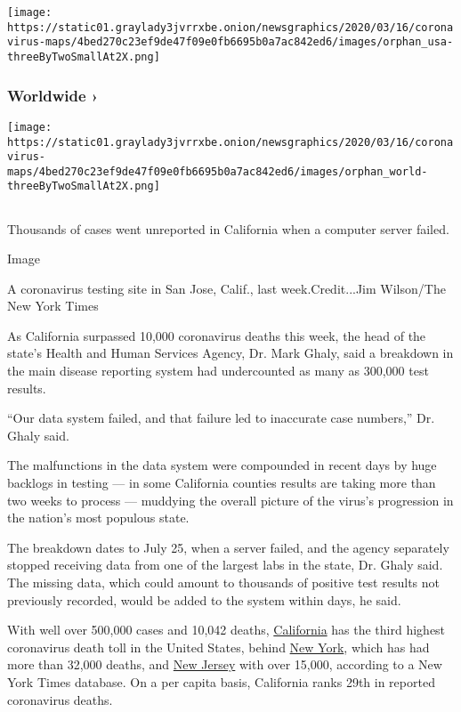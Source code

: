 \texttt{[image: https://static01.graylady3jvrrxbe.onion/newsgraphics/2020/03/16/coronavirus-maps/4bed270c23ef9de47f09e0fb6695b0a7ac842ed6/images/orphan\_usa-threeByTwoSmallAt2X.png]}
\href{https://www.nytimes3xbfgragh.onion/interactive/2020/world/coronavirus-maps.html}{}

\hypertarget{worldwide-}{%
\subsubsection{Worldwide ›}\label{worldwide-}}

\texttt{[image: https://static01.graylady3jvrrxbe.onion/newsgraphics/2020/03/16/coronavirus-maps/4bed270c23ef9de47f09e0fb6695b0a7ac842ed6/images/orphan\_world-threeByTwoSmallAt2X.png]}

\hypertarget{-2}{%
\subsection{}\label{-2}}

Thousands of cases went unreported in California when a computer server
failed.

Image

A coronavirus testing site in San Jose, Calif., last week.Credit...Jim
Wilson/The New York Times

As California surpassed 10,000 coronavirus deaths this week, the head of
the state's Health and Human Services Agency, Dr. Mark Ghaly, said a
breakdown in the main disease reporting system had undercounted as many
as 300,000 test results.

``Our data system failed, and that failure led to inaccurate case
numbers,'' Dr. Ghaly said.

The malfunctions in the data system were compounded in recent days by
huge backlogs in testing --- in some California counties results are
taking more than two weeks to process --- muddying the overall picture
of the virus's progression in the nation's most populous state.

The breakdown dates to July 25, when a server failed, and the agency
separately stopped receiving data from one of the largest labs in the
state, Dr. Ghaly said. The missing data, which could amount to thousands
of positive test results not previously recorded, would be added to the
system within days, he said.

With well over 500,000 cases and 10,042 deaths,
\href{https://www.nytimes3xbfgragh.onion/interactive/2020/us/california-coronavirus-cases.html}{California}
has the third highest coronavirus death toll in the United States,
behind
\href{https://www.nytimes3xbfgragh.onion/interactive/2020/us/new-york-coronavirus-cases.html}{New
York}, which has had more than 32,000 deaths, and
\href{https://www.nytimes3xbfgragh.onion/interactive/2020/us/new-jersey-coronavirus-cases.html}{New
Jersey} with over 15,000, according to a New York Times database. On a
per capita basis, California ranks 29th in reported coronavirus deaths.


